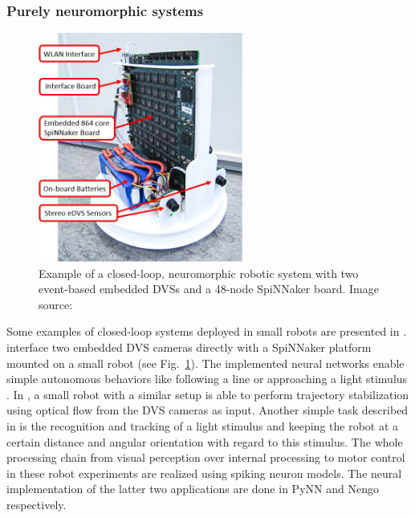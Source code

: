 \subsubsection{Purely neuromorphic systems}
\label{subsubsec:neuro_systems}

\begin{figure}[t!]
	\centering
	\includegraphics[width=0.6\textwidth]{imgs/SpinRobot.jpg}
	\caption{Example of a closed-loop, neuromorphic robotic system with two event-based embedded \acp{DVS} and a 48-node \ac{SpiNNaker} board. Image source: \textcite{Galluppi2014}}
	\label{fig:spin_robot}
\end{figure}
Some examples of closed-loop systems deployed in small robots are presented in \textcite{Davies2010, Denk2013, Galluppi2014}.
\textcites{Davies2010, Denk2013} interface two embedded \ac{DVS} cameras directly with a \ac{SpiNNaker} platform mounted on a small robot (see Fig.~\ref{fig:spin_robot}).
The implemented neural networks enable simple autonomous behaviors like following a line \parencite{Davies2010} or approaching a light stimulus \parencite{Denk2013}.
In \textcite{Galluppi2014}, a small robot with a similar setup is able to perform trajectory stabilization using optical flow from the \ac{DVS} cameras as input.
Another simple task described in \textcite{Galluppi2014} is the recognition and tracking of a light stimulus and keeping the robot at a certain distance and angular orientation with regard to this stimulus.
The whole processing chain from visual perception over internal processing to motor control in these robot experiments are realized using spiking neuron models.
The neural implementation of the latter two applications are done in \ac{PyNN} and \ac{Nengo} respectively.

